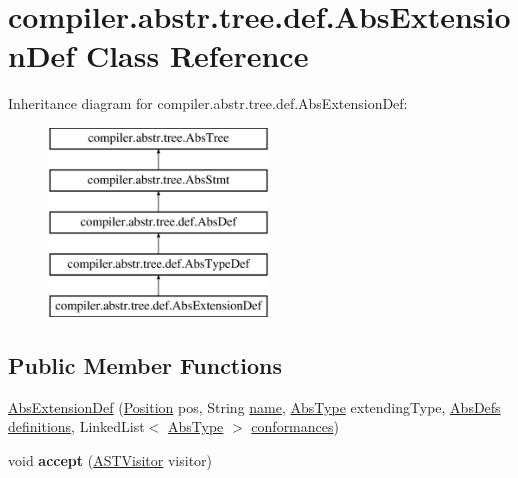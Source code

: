 \hypertarget{classcompiler_1_1abstr_1_1tree_1_1def_1_1_abs_extension_def}{}\section{compiler.\+abstr.\+tree.\+def.\+Abs\+Extension\+Def Class Reference}
\label{classcompiler_1_1abstr_1_1tree_1_1def_1_1_abs_extension_def}
Inheritance diagram for compiler.\+abstr.\+tree.\+def.\+Abs\+Extension\+Def\+:\begin{figure}[H]
\begin{center}
\leavevmode
\includegraphics[height=5.000000cm]{classcompiler_1_1abstr_1_1tree_1_1def_1_1_abs_extension_def}
\end{center}
\end{figure}
\subsection*{Public Member Functions}
\begin{DoxyCompactItemize}
\item 
\hyperlink{classcompiler_1_1abstr_1_1tree_1_1def_1_1_abs_extension_def_a844a5e501fc6a7035aaed4280298360c}{Abs\+Extension\+Def} (\hyperlink{classcompiler_1_1_position}{Position} pos, String \hyperlink{classcompiler_1_1abstr_1_1tree_1_1def_1_1_abs_def_ac6bda9377f5abbb5f1be7d3d1b16481b}{name}, \hyperlink{classcompiler_1_1abstr_1_1tree_1_1type_1_1_abs_type}{Abs\+Type} extending\+Type, \hyperlink{classcompiler_1_1abstr_1_1tree_1_1_abs_defs}{Abs\+Defs} \hyperlink{classcompiler_1_1abstr_1_1tree_1_1def_1_1_abs_extension_def_aedde8ef9d3532da24ca7e2121ffe255a}{definitions}, Linked\+List$<$ \hyperlink{classcompiler_1_1abstr_1_1tree_1_1type_1_1_abs_type}{Abs\+Type} $>$ \hyperlink{classcompiler_1_1abstr_1_1tree_1_1def_1_1_abs_extension_def_a1d827271c43d2563392448f451e2828e}{conformances})
\item 
\mbox{\label{classcompiler_1_1abstr_1_1tree_1_1def_1_1_abs_extension_def_ad80c7f3fe1db15c8309ad19567523fe5}} 
void {\bfseries accept} (\hyperlink{interfacecompiler_1_1abstr_1_1_a_s_t_visitor}{A\+S\+T\+Visitor} visitor)
\end{DoxyCompactItemize}
